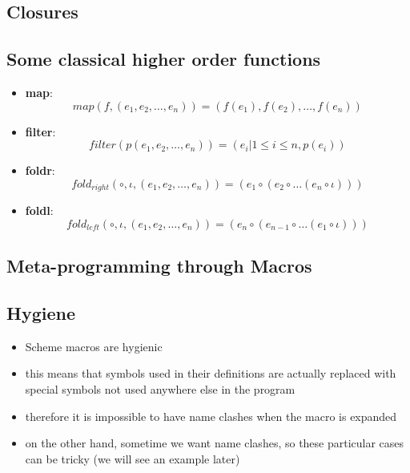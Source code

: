 \subsection{Closures}




\subsection{Some classical higher order functions}
\begin{itemize}
    \item \textbf{map}: \begin{equation} map(f,(e_1,e_2,\ldots,e_n)) = (f(e_1),f(e_2),\ldots,f(e_n)) \end{equation}
    \item \textbf{filter}: \begin{equation} filter(p(e_1,e_2,\ldots,e_n)) = (e_i|1\leq i\leq n,p(e_i)) \end{equation}
    \item \textbf{foldr}: \begin{equation} fold_{right}(\circ ,\iota,(e_1,e_2,\ldots,e_n)) = (e_1\circ(e_2\circ\ldots(e_n\circ\iota))) \end{equation}
    \item \textbf{foldl}: \begin{equation} fold_{left}(\circ ,\iota,(e_1,e_2,\ldots,e_n)) = (e_n\circ(e_{n-1}\circ\ldots(e_1\circ\iota))) \end{equation}
\end{itemize}


\subsection{Meta-programming through Macros}

\subsection{Hygiene}
\begin{itemize}
    \item Scheme macros are hygienic
    \item this means that symbols used in their definitions are actually replaced with special symbols not used anywhere else in the program
    \item therefore it is impossible to have name clashes when the macro is expanded
    \item on the other hand, sometime we want name clashes, so these particular cases can be tricky (we will see an example later)
\end{itemize}

